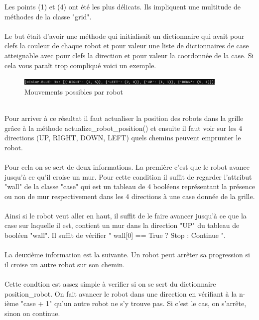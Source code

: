 \documentclass{article}
\begin{document}
Les points (1) et (4) ont été les plus délicats. Ils impliquent une multitude de méthodes de la classe "grid".\\\\ Le but était d'avoir une méthode qui initialisait un dictionnaire qui avait pour clefs la couleur de chaque robot et pour valeur une liste de dictionnaires de case atteignable avec pour clefs la direction et pour valeur la coordonnée de la case. Si cela vous paraît trop compliqué voici un exemple.
\begin{figure}[htbp]
  \centering  
  \includegraphics[width=0.9\textwidth]{possible_move.png}  
  \caption{Mouvements possibles par robot} 
  \label{fig:Mission}  
\end{figure}\\
Pour arriver à ce résultat il faut actualiser la position des robots dans la grille grâce à la méthode actualize\_robot\_position() et ensuite il faut voir sur les 4 directions (UP, RIGHT, DOWN, LEFT) quels chemins peuvent emprunter le robot.\\\\ 
Pour cela on se sert de deux informations. La première c'est que le robot avance jusqu'à ce qu'il croise un mur. Pour cette condition il suffit de regarder l'attribut "wall" de la classe "case" qui est un tableau de 4 booléens représentant la présence ou non de mur respectivement dans les 4 directions à une case donnée de la grille.\\\\
Ainsi si le robot veut aller en haut, il suffit de le faire avancer jusqu'à ce que la case sur laquelle il est, contient un mur dans la direction "UP" du tableau de booléen "wall". Il suffit de vérifier  " wall[0] == True ? Stop : Continue ".\\\\
La deuxième information est la suivante. Un robot peut arrêter sa progression si il croise un autre robot sur son chemin.\\\\ Cette condtion est assez simple à verifier si on se sert du dictionnaire position\_robot. On fait avancer le robot dans une direction en vérifiant à la n-ième "case + 1" qu'un autre robot ne s'y trouve pas. Si c'est le cas, on s'arrête, sinon on continue. 
\end{document}
